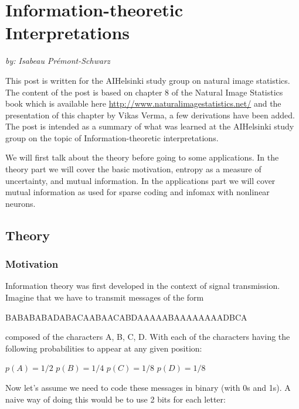 \documentclass[]{article}
\begin{document}
\section{Information-theoretic Interpretations}
\label{information-theoretic-interpretations}
\indent \indent \textit{by: Isabeau Pr\'emont-Schwarz}
\newline

This post is written for the AIHelsinki study group on natural image
statistics. The content of the post is based on chapter 8 of the Natural Image Statistics book
which is available here \url{http://www.naturalimagestatistics.net/} and the presentation of
this chapter by Vikas Verma, a few derivations have been added. The post is intended as a summary of what was learned
at the AIHelsinki study group on the topic of Information-theoretic interpretations.

We will first talk about the theory before going to some applications. In the theory part we will cover the basic motivation, entropy as a measure of uncertainty, and mutual information. In the applications part we will cover mutual information as used for sparse coding and infomax with nonlinear neurons. 

\subsection{Theory}
\label{theory}
\subsubsection{Motivation}
\label{motivation}
Information theory was first developed in the context of signal transmission. Imagine that we have to transmit messages of the form 

\begin{minipage}{15em}
BABABABADABACAABAACABDAAAAABAAAAAAAADBCA
\end{minipage}

composed of the characters A, B, C, D. With each of the characters having the following probabilities to appear at any given position:

\begin{minipage}{15em}
\centering
$p(A) = 1/2 $
$p(B) =  1/4 $
$p(C) =  1/8 $
$p(D) =  1/8 $
\end{minipage}

Now let's assume we need to code these messages in binary (with 0s and 1s). A naive way of doing this would be to use 2 bits for each letter:
\end{document}
